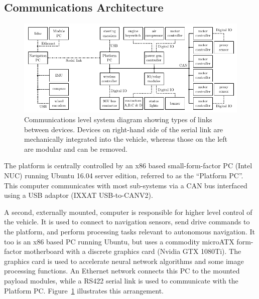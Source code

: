 \documentclass[preprint,authoryear,12pt]{elsarticle}
\begin{document}
    \subsection{Communications Architecture}
    \label{sect:architecture}

        \begin{figure}[htb]
            \centering
            \includegraphics[width=\linewidth]{imgs/system_diagram/diagram_v5.pdf}
            \caption{
                Communications level system diagram showing types of links between devices.
                Devices on right-hand side of the serial link are mechanically integrated into the vehicle, whereas those on the left are modular and can be removed.
            }
            \label{fig:system_diagram}
        \end{figure}

        The platform is centrally controlled by an x86 based small-form-factor PC (Intel NUC) running Ubuntu 16.04 server edition, referred to as the ``Platform PC''.
        This computer communicates with most sub-systems via a CAN bus interfaced using a USB adaptor (IXXAT USB-to-CANV2).

        A second, externally mounted, computer is responsible for higher level control of the vehicle.
        It is used to connect to navigation sensors, send drive commands to the platform, and perform processing tasks relevant to autonomous navigation.
        It too is an x86 based PC running Ubuntu, but uses a commodity microATX form-factor motherboard with a discrete graphics card (Nvidia GTX 1080Ti).
        The graphics card is used to accelerate neural network algorithms and some image processing functions.
        An Ethernet network connects this PC to the mounted payload modules, while a RS422 serial link is used to communicate with the Platform PC.
        Figure~\ref{fig:system_diagram} illustrates this arrangement.
\end{document}
